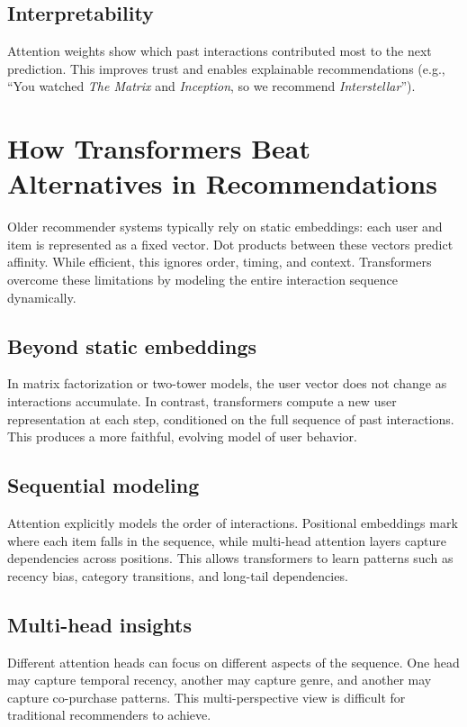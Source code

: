 \documentclass[12pt]{article}
\begin{document}
\subsection{Interpretability}
Attention weights show which past interactions contributed most to the next prediction. This improves trust and enables explainable recommendations (e.g., ``You watched \emph{The Matrix} and \emph{Inception}, so we recommend \emph{Interstellar}'').

\section{How Transformers Beat Alternatives in Recommendations}

Older recommender systems typically rely on static embeddings: each user and item is represented as a fixed vector. Dot products between these vectors predict affinity. While efficient, this ignores order, timing, and context. Transformers overcome these limitations by modeling the entire interaction sequence dynamically.

\subsection{Beyond static embeddings}
In matrix factorization or two-tower models, the user vector does not change as interactions accumulate. In contrast, transformers compute a new user representation at each step, conditioned on the full sequence of past interactions. This produces a more faithful, evolving model of user behavior.

\subsection{Sequential modeling}
Attention explicitly models the order of interactions. Positional embeddings mark where each item falls in the sequence, while multi-head attention layers capture dependencies across positions. This allows transformers to learn patterns such as recency bias, category transitions, and long-tail dependencies.

\subsection{Multi-head insights}
Different attention heads can focus on different aspects of the sequence. One head may capture temporal recency, another may capture genre, and another may capture co-purchase patterns. This multi-perspective view is difficult for traditional recommenders to achieve.
\end{document}
